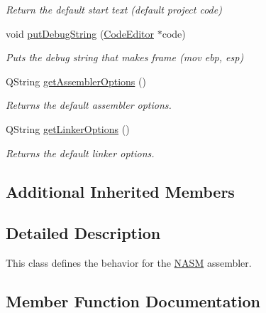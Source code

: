 \begin{DoxyCompactItemize}
\begin{DoxyCompactList}\small\item\em Return the default start text (default project code) \end{DoxyCompactList}\item 
void \hyperlink{class_n_a_s_m_ac4d6d818bc36b8057e21b145480af894}{put\+Debug\+String} (\hyperlink{class_code_editor}{Code\+Editor} $\ast$code)
\begin{DoxyCompactList}\small\item\em Puts the debug string that makes frame (mov ebp, esp) \end{DoxyCompactList}\item 
\hypertarget{class_n_a_s_m_a695bf581a61d6a83235a73c741650ff7}{}Q\+String \hyperlink{class_n_a_s_m_a695bf581a61d6a83235a73c741650ff7}{get\+Assembler\+Options} ()\label{class_n_a_s_m_a695bf581a61d6a83235a73c741650ff7}

\begin{DoxyCompactList}\small\item\em Returns the default assembler options. \end{DoxyCompactList}\item 
\hypertarget{class_n_a_s_m_a6aac9e3f8fa1f9243d4f4fe44f82ffb4}{}Q\+String \hyperlink{class_n_a_s_m_a6aac9e3f8fa1f9243d4f4fe44f82ffb4}{get\+Linker\+Options} ()\label{class_n_a_s_m_a6aac9e3f8fa1f9243d4f4fe44f82ffb4}

\begin{DoxyCompactList}\small\item\em Returns the default linker options. \end{DoxyCompactList}\end{DoxyCompactItemize}
\subsection*{Additional Inherited Members}


\subsection{Detailed Description}
This class defines the behavior for the \hyperlink{class_n_a_s_m}{N\+A\+S\+M} assembler. 



\subsection{Member Function Documentation}
\hypertarget{class_n_a_s_m_abcab860e849ddbfe4ead2baaa09ba592}{}
